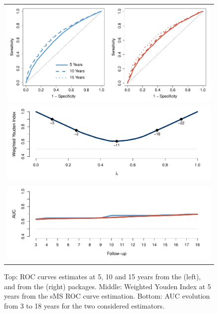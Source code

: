 \vspace{0.5cm}\noindent
\begin{figure}[h]
\begin{center}
\begin{tabular}{c}
\includegraphics[width=12.0cm]{figures/ROCFigure3.pdf} \\
\includegraphics[width=12.0cm]{figures/YoudenFigure3.pdf} \\
\includegraphics[width=12.0cm]{figures/AUCFigure3.pdf} \\
\end{tabular}
\caption{{\footnotesize{Top: ROC curves estimates at 5, 10 and 15 years from the  (left), and from the  (right) packages. Middle: Weighted Youden Index at 5 years from the sMS ROC curve estimation. Bottom: AUC evolution from 3 to 18 years for the two considered estimators}. \label{FE3}}}
\end{center}
\end{figure} 

